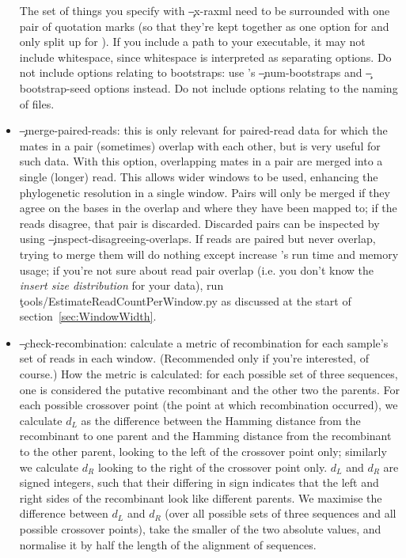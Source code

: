 \begin{itemize}
The set of things you specify with \c{--x-raxml} need to be surrounded with one pair of quotation marks (so that they're kept together as one option for \pmt and only split up for \R).
If you include a path to your \R executable, it may not include whitespace, since whitespace is interpreted as separating \R options.
Do not include options relating to bootstraps: use \pmt's \c{--num-bootstraps} and \c{--bootstrap-seed} options instead.
Do not include options relating to the naming of files.
\item \c{--merge-paired-reads}: this is only relevant for paired-read data for which the mates in a pair
(sometimes) overlap with each other, but is very useful for such data.
With this option, overlapping mates in a pair are merged into a single (longer) read.
This allows wider windows to be used, enhancing the phylogenetic resolution in a single window.
Pairs will only be merged if they agree on the bases in the overlap and where they have been mapped to; if the reads disagree, that pair is discarded.
Discarded pairs can be inspected by using \c{--inspect-disagreeing-overlaps}.
If reads are paired but never overlap, trying to merge them will do nothing except increase \pmt's run time and memory usage; if you're not sure about read pair overlap (i.e. you don't know the {\it insert size distribution} for your data), run \\\c{tools/EstimateReadCountPerWindow.py} as discussed at the start of section~\ref{sec:WindowWidth}.
\item \c{--check-recombination}: calculate a metric of recombination for each sample's set of reads in each window.
(Recommended only if you're interested, of course.)
How the metric is calculated: for each possible set of three sequences, one is considered the putative recombinant and the other two the parents.
For each possible crossover point (the point at which recombination occurred), we calculate $d_L$ as the difference between the Hamming distance from the recombinant to one parent and the Hamming distance from the recombinant to the other parent, looking to the left of the crossover point only; similarly we calculate $d_R$ looking to the right of the crossover point only.
$d_L$ and $d_R$ are signed integers, such that their differing in sign indicates that the left and right sides of the recombinant look like different parents.
We maximise the difference between $d_L$ and $d_R$ (over all possible sets of three sequences and all possible crossover points), take the smaller of the two absolute values, and normalise it by half the length of the alignment of sequences.

\end{itemize}
